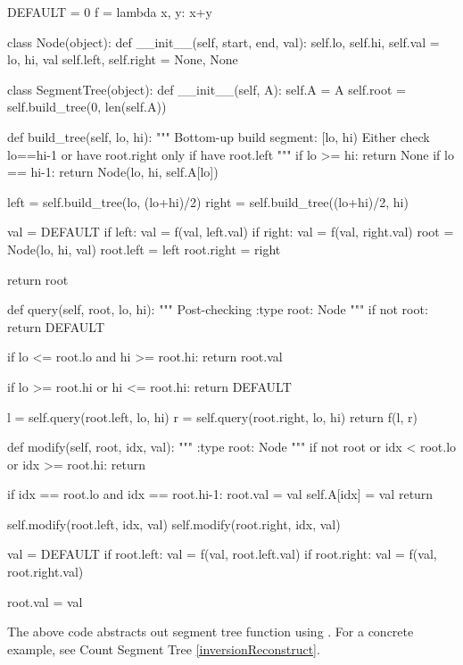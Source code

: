 \begin{python}
DEFAULT = 0
f = lambda x, y: x+y


class Node(object):
    def __init__(self, start, end, val):
        self.lo, self.hi, self.val = lo, hi, val
        self.left, self.right = None, None


class SegmentTree(object):
    def __init__(self, A):
        self.A = A
        self.root = self.build_tree(0, len(self.A))

    def build_tree(self, lo, hi):
        """
        Bottom-up build
        segment: [lo, hi)
        Either check lo==hi-1 or have root.right 
        only if have root.left
        """
        if lo >= hi:   return None
        if lo == hi-1: return Node(lo, hi, self.A[lo])

        left  = self.build_tree(lo, (lo+hi)/2)
        right = self.build_tree((lo+hi)/2, hi)

        val = DEFAULT
        if left:  val = f(val, left.val)
        if right: val = f(val, right.val)
        root = Node(lo, hi, val)
        root.left  = left
        root.right = right

        return root

    def query(self, root, lo, hi):
        """
        Post-checking
        :type root: Node
        """
        if not root:
            return DEFAULT

        if lo <= root.lo and hi >= root.hi:
            return root.val

        if lo >= root.hi or  hi <= root.hi:
            return DEFAULT

        l = self.query(root.left,  lo, hi)
        r = self.query(root.right, lo, hi)
        return f(l, r)

    def modify(self, root, idx, val):
        """
        :type root: Node
        """
        if not root or idx < root.lo or idx >= root.hi:
            return

        if idx == root.lo and idx == root.hi-1:
            root.val = val
            self.A[idx] = val
            return

        self.modify(root.left,  idx, val)
        self.modify(root.right, idx, val)

        val = DEFAULT
        if root.left:  val = f(val, root.left.val)
        if root.right: val = f(val, root.right.val)
        
        root.val = val
\end{python}
The above code abstracts out segment tree function using . For a concrete example, see Count Segment Tree \ref{inversionReconstruct}. 

